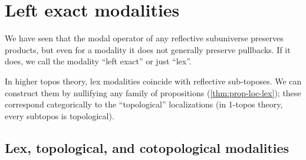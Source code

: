 \section{Left exact modalities}\label{sec:left-exact-modal}

We have seen that the modal operator of any reflective subuniverse preserves products, but even for a modality it does not generally preserve pullbacks.
If it does, we call the modality ``left exact'' or just ``lex''.

In higher topos theory, lex modalities coincide with reflective sub-toposes.
We can construct them by nullifying any family of propositions (\autoref{thm:prop-loc-lex}); these correspond categorically to the ``topological'' localizations (in 1-topos theory, every subtopos is topological).

\subsection{Lex, topological, and cotopological modalities}
\label{sec:lex-top-cotop}

